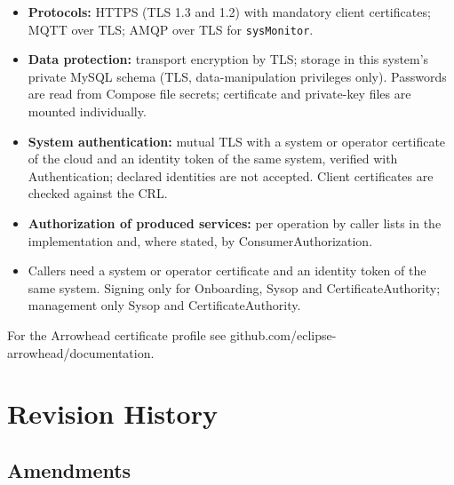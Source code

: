 \documentclass[a4paper]{arrowhead}
\begin{document}
\begin{itemize}
  \item \textbf{Protocols:} HTTPS (TLS 1.3 and 1.2) with mandatory client certificates; MQTT over TLS; AMQP over TLS for \texttt{sysMonitor}.
  \item \textbf{Data protection:} transport encryption by TLS; storage in this system's private MySQL schema (TLS, data-manipulation privileges only). Passwords are read from Compose file secrets; certificate and private-key files are mounted individually.
  \item \textbf{System authentication:} mutual TLS with a system or operator certificate of the cloud and an identity token of the same system, verified with Authentication; declared identities are not accepted. Client certificates are checked against the CRL.
  \item \textbf{Authorization of produced services:} per operation by caller lists in the implementation and, where stated, by ConsumerAuthorization.
  \item Callers need a system or operator certificate and an identity token of the same system. Signing only for Onboarding, Sysop and Certificate\allowbreak{}Authority; management only Sysop and Certificate\allowbreak{}Authority.
\end{itemize}

For the Arrowhead certificate profile see github.com/eclipse-arrowhead/documentation.





\newpage

\section{Revision History}
\subsection{Amendments}
\end{document}
